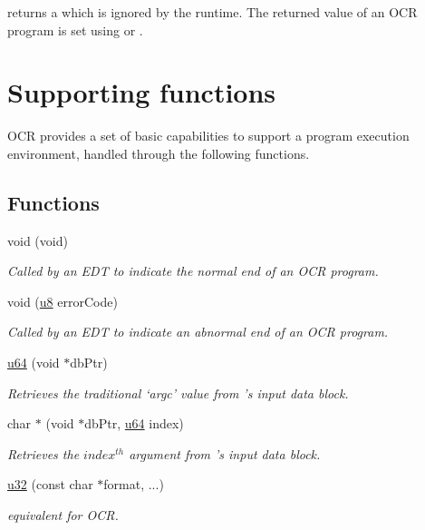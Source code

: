 \returns
{} returns a \hyperlink{type_ocrGuid_t}{} which is
ignored by the runtime. The returned value of an OCR program is set using
\hyperlink{func_ocrShutdown}{} or \hyperlink{func_ocrAbort}{
  }.
\section{Supporting functions}
\label{sec:supportFuncs}

OCR provides a set of basic capabilities to support a program execution environment,
handled through the following functions.

\subsection*{Functions}
\begin{DoxyCompactItemize}
\item
  void \hyperlink{func_ocrShutdown}{}(void)
    \begin{DoxyCompactList}
      \small\item \emph{Called by an EDT to indicate the normal end of
        an OCR program.}
    \end{DoxyCompactList}
\item
  void \hyperlink{func_ocrAbort}{}(\hyperlink{type_u8}{u8} errorCode)
    \begin{DoxyCompactList}
      \small\item \emph{Called by an EDT to indicate an abnormal end of an OCR program.}
    \end{DoxyCompactList}
\item
  \hyperlink{type_u64}{u64} \hyperlink{func_ocrGetArgc}{}(void $\ast$dbPtr)
    \begin{DoxyCompactList}
      \small\item \emph{Retrieves the traditional `argc' value from
        \hyperlink{func_mainEdt}{}'s input data block.}
    \end{DoxyCompactList}
\item
  char $\ast$ \hyperlink{func_ocrGetArgv}{}(void $\ast$dbPtr,
  \hyperlink{type_u64}{u64} index)
    \begin{DoxyCompactList}
      \small\item \emph{Retrieves the $index^{th}$ argument from
        \hyperlink{func_mainEdt}{}'s input data block.}
    \end{DoxyCompactList}
\item
  \hyperlink{type_u32}{u32} \hyperlink{func_ocrPrintf}{}(const char $\ast$format, ...)
    \begin{DoxyCompactList}
      \small\item \emph{ equivalent for OCR.}
    \end{DoxyCompactList}
\end{DoxyCompactItemize}
